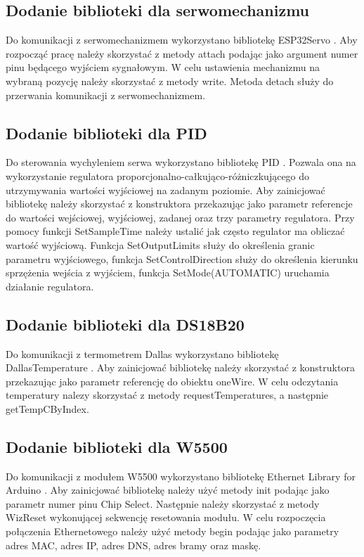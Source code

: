 \documentclass[11pt]{report}
\begin{document}
 \subsection{Dodanie biblioteki dla serwomechanizmu}
 Do komunikacji z serwomechanizmem wykorzystano bibliotekę ESP32Servo \cite{Servolibrary}. Aby rozpocząć pracę należy skorzystać z metody attach podając jako argument numer pinu będącego wyjściem sygnałowym. W celu ustawienia mechanizmu na wybraną pozycję należy skorzystać z metody write. Metoda detach służy do przerwania komunikacji z serwomechanizmem.
 \subsection{Dodanie biblioteki dla PID}
 Do sterowania wychyleniem serwa wykorzystano bibliotekę PID \cite{PIDlibrary}. Pozwala ona na wykorzystanie regulatora proporcjonalno-całkująco-różniczkującego do utrzymywania wartości wyjściowej na zadanym poziomie.
 Aby zainicjować bibliotekę  należy skorzystać z konstruktora przekazując jako parametr referencje do wartości wejściowej, wyjściowej, zadanej oraz trzy parametry regulatora. Przy pomocy funkcji SetSampleTime należy ustalić jak często regulator ma obliczać wartość wyjściową. Funkcja SetOutputLimits służy do określenia granic parametru wyjściowego, funkcja SetControlDirection służy do określenia kierunku sprzężenia wejścia z wyjściem, funkcja SetMode(AUTOMATIC) uruchamia działanie regulatora.
 \subsection{Dodanie biblioteki dla DS18B20}
 Do komunikacji z termometrem Dallas wykorzystano bibliotekę DallasTemperature \cite{dallaslibrary}. Aby zainicjować bibliotekę należy skorzystać z konstruktora przekazując jako parametr referencję do obiektu oneWire. W celu odczytania temperatury nalezy skorzystać z metody requestTemperatures, a następnie getTempCByIndex.
 \subsection{Dodanie biblioteki dla W5500}
 Do komunikacji z modułem W5500 wykorzystano bibliotekę Ethernet Library for Arduino \cite{ethernetlibrary}. Aby zainicjować bibliotekę należy użyć metody init podając jako parametr numer pinu Chip Select. Następnie należy skorzystać z metody WizReset wykonującej sekwencję resetowania modułu. W celu rozpoczęcia połączenia Ethernetowego należy użyć metody begin podając jako parametry adres MAC, adres IP, adres DNS, adres bramy oraz maskę.
\end{document}
